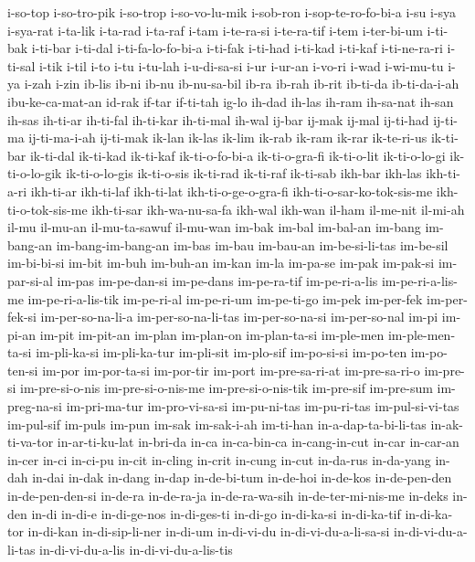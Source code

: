 {i-so-top i-so-tro-pik i-so-trop i-so-vo-lu-mik i-sob-ron
i-sop-te-ro-fo-bi-a i-su i-sya i-sya-rat i-ta-lik i-ta-rad i-ta-raf i-tam
i-te-ra-si i-te-ra-tif i-tem i-ter-bi-um i-ti-bak i-ti-bar i-ti-dal
i-ti-fa-lo-fo-bi-a i-ti-fak i-ti-had i-ti-kad i-ti-kaf i-ti-ne-ra-ri
i-ti-sal i-tik i-til i-to i-tu i-tu-lah i-u-di-sa-si i-ur i-ur-an i-vo-ri
i-wad i-wi-mu-tu i-ya i-zah i-zin ib-lis ib-ni ib-nu ib-nu-sa-bil ib-ra
ib-rah ib-rit ib-ti-da ib-ti-da-i-ah ibu-ke-ca-mat-an id-rak if-tar
if-ti-tah ig-lo ih-dad ih-las ih-ram ih-sa-nat ih-san ih-sas ih-ti-ar
ih-ti-fal ih-ti-kar ih-ti-mal ih-wal ij-bar ij-mak ij-mal ij-ti-had
ij-ti-ma ij-ti-ma-i-ah ij-ti-mak ik-lan ik-las ik-lim ik-rab ik-ram ik-rar
ik-te-ri-us ik-ti-bar ik-ti-dal ik-ti-kad ik-ti-kaf ik-ti-o-fo-bi-a
ik-ti-o-gra-fi ik-ti-o-lit ik-ti-o-lo-gi ik-ti-o-lo-gik ik-ti-o-lo-gis
ik-ti-o-sis ik-ti-rad ik-ti-raf ik-ti-sab ikh-bar ikh-las ikh-ti-a-ri
ikh-ti-ar ikh-ti-laf ikh-ti-lat ikh-ti-o-ge-o-gra-fi
ikh-ti-o-sar-ko-tok-sis-me ikh-ti-o-tok-sis-me ikh-ti-sar ikh-wa-nu-sa-fa
ikh-wal ikh-wan il-ham il-me-nit il-mi-ah il-mu il-mu-an il-mu-ta-sawuf
il-mu-wan im-bak im-bal im-bal-an im-bang im-bang-an im-bang-im-bang-an
im-bas im-bau im-bau-an im-be-si-li-tas im-be-sil im-bi-bi-si im-bit
im-buh im-buh-an im-kan im-la im-pa-se im-pak im-pak-si im-par-si-al
im-pas im-pe-dan-si im-pe-dans im-pe-ra-tif im-pe-ri-a-lis
im-pe-ri-a-lis-me im-pe-ri-a-lis-tik im-pe-ri-al im-pe-ri-um im-pe-ti-go
im-pek im-per-fek im-per-fek-si im-per-so-na-li-a im-per-so-na-li-tas
im-per-so-na-si im-per-so-nal im-pi im-pi-an im-pit im-pit-an im-plan
im-plan-on im-plan-ta-si im-ple-men im-ple-men-ta-si im-pli-ka-si
im-pli-ka-tur im-pli-sit im-plo-sif im-po-si-si im-po-ten im-po-ten-si
im-por im-por-ta-si im-por-tir im-port im-pre-sa-ri-at im-pre-sa-ri-o
im-pre-si im-pre-si-o-nis im-pre-si-o-nis-me im-pre-si-o-nis-tik
im-pre-sif im-pre-sum im-preg-na-si im-pri-ma-tur im-pro-vi-sa-si
im-pu-ni-tas im-pu-ri-tas im-pul-si-vi-tas im-pul-sif im-puls im-pun
im-sak im-sak-i-ah im-ti-han in-a-dap-ta-bi-li-tas in-ak-ti-va-tor
in-ar-ti-ku-lat in-bri-da in-ca in-ca-bin-ca in-cang-in-cut in-car
in-car-an in-cer in-ci in-ci-pu in-cit in-cling in-crit in-cung in-cut
in-da-rus in-da-yang in-dah in-dai in-dak in-dang in-dap in-de-bi-tum
in-de-hoi in-de-kos in-de-pen-den in-de-pen-den-si in-de-ra in-de-ra-ja
in-de-ra-wa-sih in-de-ter-mi-nis-me in-deks in-den in-di in-di-e
in-di-ge-nos in-di-ges-ti in-di-go in-di-ka-si in-di-ka-tif in-di-ka-tor
in-di-kan in-di-sip-li-ner in-di-um in-di-vi-du in-di-vi-du-a-li-sa-si
in-di-vi-du-a-li-tas in-di-vi-du-a-lis in-di-vi-du-a-lis-tis
}
